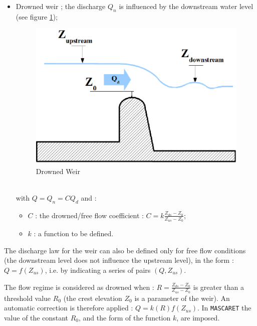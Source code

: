\begin{itemize}
 \item \textsf{Drowned weir}  ; the discharge $Q_n$ is influenced by the downstream water level (see figure \ref{Sn});
    \begin{figure}
     \begin{center}
        \includegraphics[scale=1.]{Figures/Schema_Seuil_Noye.eps}
        \caption{Drowned Weir}
        \label{Sn}
     \end{center}
    \end{figure}
    \\
    with $Q = Q_n = C Q_d$ and :
    \begin{itemize}
      \item $C$ : the drowned/free flow coefficient : $C = k \frac{Z_{ds}-Z_{0}}{Z_{us}-Z_0}$;
      \item $k$ : a function to be defined.
    \end{itemize}

\end{itemize}

\vspace{0.5cm}

The discharge law for the weir can also be defined only for free flow conditions (the downstream level does not influence the upstream level), in the form : $Q = f(Z_{us})$, i.e. by indicating a series of pairs $(Q,Z_{us})$.

\vspace{0.5cm}

The flow regime is considered as drowned when : $R = \frac{Z_{ds}-Z_0}{Z_{us}-Z_0}$ is greater than a threshold value $R_0$ (the crest elevation $Z_0$ is a parameter of the weir). An automatic correction is therefore applied : $Q = k(R) f(Z_{us})$. In \texttt{MASCARET} the value of the constant $R_0$, and the form of the function $k$, are imposed.

